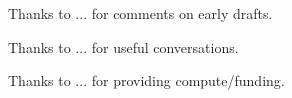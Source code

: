Thanks to ... for comments on early drafts.

Thanks to ... for useful conversations.

Thanks to ... for providing compute/funding.

